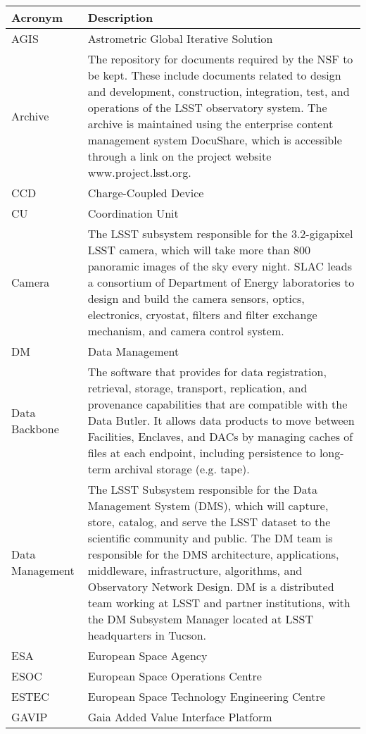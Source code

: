 \addtocounter{table}{-1}
\begin{longtable}{|l|p{}|}\hline
\textbf{Acronym} & \textbf{Description}  \\\hline

AGIS & Astrometric Global Iterative Solution \\\hline
Archive & The repository for documents required by the NSF to be kept. These include documents related to design and development, construction, integration, test, and operations of the LSST observatory system. The archive is maintained using the enterprise content management system DocuShare, which is accessible through a link on the project website www.project.lsst.org. \\\hline
CCD & Charge-Coupled Device \\\hline
CU & Coordination Unit \\\hline
Camera & The LSST subsystem responsible for the 3.2-gigapixel LSST camera, which will take more than 800 panoramic images of the sky every night. SLAC leads a consortium of Department of Energy laboratories to design and build the camera sensors, optics, electronics, cryostat, filters and filter exchange mechanism, and camera control system. \\\hline
DM & Data Management \\\hline
Data Backbone & The software that provides for data registration, retrieval, storage, transport, replication, and provenance capabilities that are compatible with the Data Butler. It allows data products to move between Facilities, Enclaves, and DACs by managing caches of files at each endpoint, including persistence to long-term archival storage (e.g. tape). \\\hline
Data Management & The LSST Subsystem responsible for the Data Management System (DMS), which will capture, store, catalog, and serve the LSST dataset to the scientific community and public. The DM team is responsible for the DMS architecture, applications, middleware, infrastructure, algorithms, and Observatory Network Design. DM is a distributed team working at LSST and partner institutions, with the DM Subsystem Manager located at LSST headquarters in Tucson. \\\hline
ESA & European Space Agency \\\hline
ESOC & European Space Operations Centre \\\hline
ESTEC & European Space Technology Engineering Centre \\\hline
GAVIP & Gaia Added Value Interface Platform \\\hline

\end{longtable}
